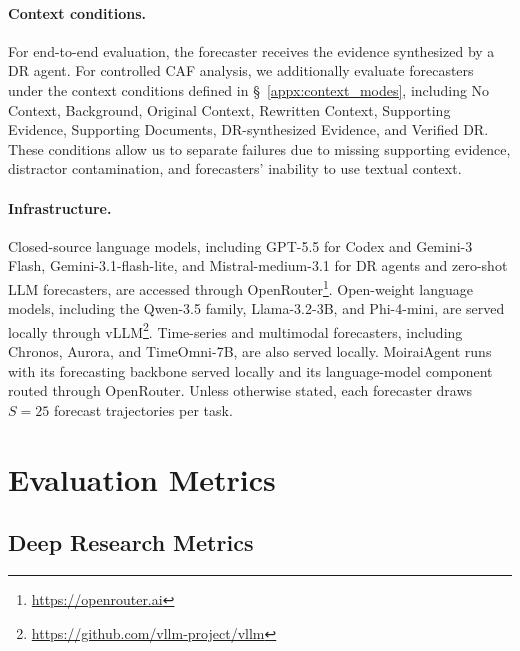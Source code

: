 \documentclass[]{servicenow}
\begin{document}
\paragraph{Context conditions.}
For end-to-end evaluation, the forecaster receives the evidence synthesized by a DR agent.
For controlled CAF analysis, we additionally evaluate forecasters under the context conditions defined in \S~\ref{appx:context_modes}, including No Context, Background, Original Context, Rewritten Context, Supporting Evidence, Supporting Documents, DR-synthesized Evidence, and Verified DR.
These conditions allow us to separate failures due to missing supporting evidence, distractor contamination, and forecasters' inability to use textual context.

\paragraph{Infrastructure.}
Closed-source language models, including GPT-5.5 for Codex and Gemini-3 Flash, Gemini-3.1-flash-lite, and Mistral-medium-3.1 for DR agents and zero-shot LLM forecasters, are accessed through OpenRouter\footnote{\url{https://openrouter.ai}}.
Open-weight language models, including the Qwen-3.5 family, Llama-3.2-3B, and Phi-4-mini, are served locally through vLLM\footnote{\url{https://github.com/vllm-project/vllm}}.
Time-series and multimodal forecasters, including Chronos, Aurora, and TimeOmni-7B, are also served locally.
MoiraiAgent runs with its forecasting backbone served locally and its language-model component routed through OpenRouter.
Unless otherwise stated, each forecaster draws $S{=}25$ forecast trajectories per task.


\section{Evaluation Metrics}
\label{app:metrics}

\subsection{Deep Research Metrics}
\label{app:metrics-dr}
\end{document}
